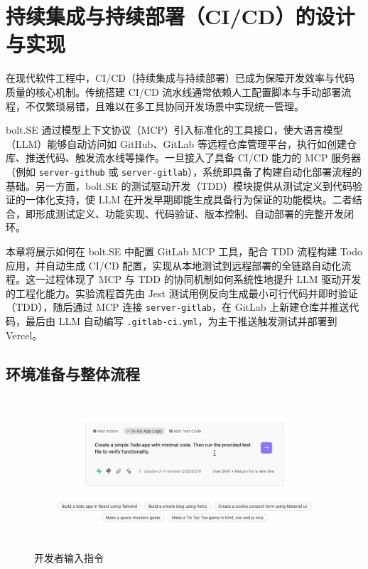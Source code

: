 
\chapter{持续集成与持续部署（CI/CD）的设计与实现}
\label{chap:mcp-tdd-cicd}

在现代软件工程中，CI/CD（持续集成与持续部署）已成为保障开发效率与代码质量的核心机制。传统搭建 CI/CD 流水线通常依赖人工配置脚本与手动部署流程，不仅繁琐易错，且难以在多工具协同开发场景中实现统一管理。

bolt.SE 通过模型上下文协议（MCP）引入标准化的工具接口，使大语言模型（LLM）能够自动访问如 GitHub、GitLab 等远程仓库管理平台，执行如创建仓库、推送代码、触发流水线等操作。一旦接入了具备 CI/CD 能力的 MCP 服务器（例如 \texttt{server-github} 或 \texttt{server-gitlab}），系统即具备了构建自动化部署流程的基础。另一方面，bolt.SE 的测试驱动开发（TDD）模块提供从测试定义到代码验证的一体化支持，使 LLM 在开发早期即能生成具备行为保证的功能模块。二者结合，即形成测试定义、功能实现、代码验证、版本控制、自动部署的完整开发闭环。

本章将展示如何在 bolt.SE 中配置 GitLab MCP 工具，配合 TDD 流程构建 Todo 应用，并自动生成 CI/CD 配置，实现从本地测试到远程部署的全链路自动化流程。这一过程体现了 MCP 与 TDD 的协同机制如何系统性地提升 LLM 驱动开发的工程化能力。实验流程首先由 Jest 测试用例反向生成最小可行代码并即时验证（TDD），随后通过 MCP 连接 \texttt{server-gitlab}，在 GitLab 上新建仓库并推送代码，最后由 LLM 自动编写 \texttt{.gitlab-ci.yml}，为主干推送触发测试并部署到 Vercel。

\section{环境准备与整体流程}
\label{sec:cicd-overview}

\begin{figure}[H]
    \centering
    \includegraphics[width=\textwidth]{figures/screenshots/ci-cd/ci_prompt.png}
    \caption{开发者输入指令}
    \label{fig:ci_prompt}
\end{figure}

